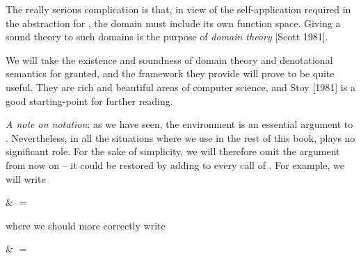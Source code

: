 
\noindent The
really serious complication is that, in view of the self-application required in
the \tl{} abstraction for , the domain must include its own function space. Giving a sound theory to such domains is the purpose of \textit{domain theory} [Scott 1981].

We will take the existence and soundness of domain theory and denotational semantics for granted, and the framework they provide will prove to be
quite useful. They are rich and beautiful areas of computer science, and Stoy
[1981] is a good starting-point for further reading.

\textit{A note on notation}: as we have seen, the environment \tr{} is an essential
argument to . Nevertheless, in all the situations where we use  in the
rest of this book, \tr{} plays no significant role. For the sake of simplicity, we will
therefore omit the argument \tr{} from now on -- it could be restored by adding \tr{}
to every call of . For example, we will write

\begin{mlalign}
     & $=$ 
\end{mlalign}

where we should more correctly write

\begin{mlalign}
     \tr{} & $=$  \tr{}
\end{mlalign}

